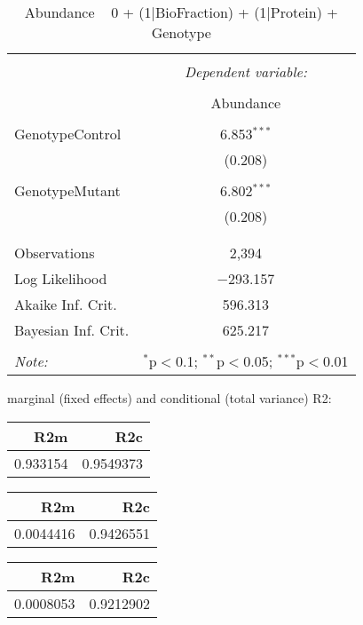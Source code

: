 \documentclass[11pt]{report}
\begin{document}
\begin{table}[!htbp] \centering 
  \caption{Abundance ~ 0 + (1|BioFraction) + (1|Protein) + Genotype} 
  \label{} 
\begin{tabular}{@{\extracolsep{5pt}}lc} 
\\[-1.8ex]\hline 
\hline \\[-1.8ex] 
 & \multicolumn{1}{c}{\textit{Dependent variable:}} \\ 
\cline{2-2} 
\\[-1.8ex] & Abundance \\ 
\hline \\[-1.8ex] 
 GenotypeControl & 6.853$^{***}$ \\ 
  & (0.208) \\ 
  & \\ 
 GenotypeMutant & 6.802$^{***}$ \\ 
  & (0.208) \\ 
  & \\ 
\hline \\[-1.8ex] 
Observations & 2,394 \\ 
Log Likelihood & $-$293.157 \\ 
Akaike Inf. Crit. & 596.313 \\ 
Bayesian Inf. Crit. & 625.217 \\ 
\hline 
\hline \\[-1.8ex] 
\textit{Note:}  & \multicolumn{1}{r}{$^{*}$p$<$0.1; $^{**}$p$<$0.05; $^{***}$p$<$0.01} \\ 
\end{tabular} 
\end{table} 
marginal (fixed effects) and conditional (total variance) R2:

\begin{tabular}{r|r}
\hline
R2m & R2c\\
\hline
0.933154 & 0.9549373\\
\hline
\end{tabular}

\begin{tabular}{r|r}
\hline
R2m & R2c\\
\hline
0.0044416 & 0.9426551\\
\hline
\end{tabular}

\begin{tabular}{r|r}
\hline
R2m & R2c\\
\hline
0.0008053 & 0.9212902\\
\hline
\end{tabular}
\end{document}
